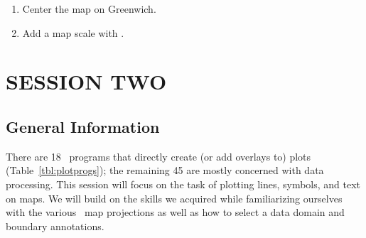\documentclass{report}
\begin{document}
\begin{enumerate}

\item Center the map on Greenwich.

\item Add a map scale with .

\end{enumerate}

\chapter{SESSION TWO} 
\thispagestyle{headings}

\section{General Information}

There are 18 \GMT\ programs that directly create (or add overlays to)
plots (Table~\ref{tbl:plotprogs}); the remaining 45 are mostly concerned with data
processing.  This session will focus on the task of plotting
lines, symbols, and text on maps.  We will build on the skills
we acquired while familiarizing ourselves with the various
\GMT\ map projections as well as how to select a data domain
and boundary annotations.
\end{document}
